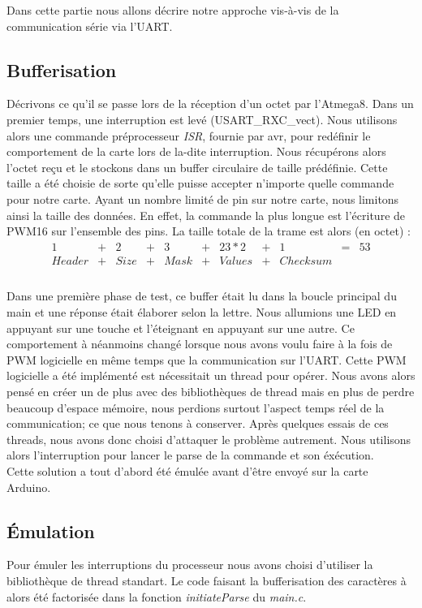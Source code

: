 Dans cette partie nous allons décrire notre approche vis-à-vis de la 
communication série via l'UART.

\subsection{Bufferisation}
Décrivons ce qu'il se passe lors de la réception d'un octet par l'Atmega8. 
Dans un premier temps, une interruption est levé (USART\_RXC\_vect). Nous 
utilisons alors une commande préprocesseur \textit{ISR}, fournie par avr, 
pour redéfinir le comportement de la carte lors de la-dite interruption.
Nous récupérons alors l'octet reçu et le stockons dans un buffer circulaire
de taille prédéfinie. Cette taille a été choisie de sorte qu'elle puisse 
accepter n'importe quelle commande pour notre carte. Ayant un nombre limité
de pin sur notre carte, nous limitons ainsi la taille des données. En 
effet, la commande la plus longue est l'écriture de PWM16 sur l'ensemble
des pins. La taille totale de la trame est alors (en octet) : \\
$$
\begin{array}{ccccccccccc}
1     &+&   2&+&   3&+&  23*2&+&       1&=&53\\
Header&+&Size&+&Mask&+&Values&+&Checksum& &\\
\end{array}
$$
~\\

Dans une première phase de test, ce buffer était lu dans la boucle principal
du main et une réponse était élaborer selon la lettre. Nous allumions une
LED en appuyant sur une touche et l'éteignant en appuyant sur une autre.
Ce comportement à néanmoins changé lorsque nous avons voulu faire à la fois
de PWM logicielle en même temps que la communication sur l'UART.
Cette PWM logicielle a été implémenté est nécessitait un thread pour opérer.
Nous avons alors pensé en créer un de plus avec des bibliothèques de thread
mais en plus de perdre beaucoup d'espace mémoire, nous perdions surtout
l'aspect temps réel de la communication; ce que nous tenons à conserver.
Après quelques essais de ces threads, nous avons donc choisi d'attaquer le
problème autrement. Nous utilisons alors l'interruption pour lancer le parse
de la commande et son éxécution.\\

Cette solution a tout d'abord été émulée avant d'être envoyé sur la carte 
Arduino.

\subsection{Émulation}
Pour émuler les interruptions du processeur nous avons choisi d'utiliser 
la bibliothèque de thread standart. Le code faisant la bufferisation
des caractères à alors été factorisée dans la fonction 
\textit{initiateParse} du \textit{main.c}.\\



